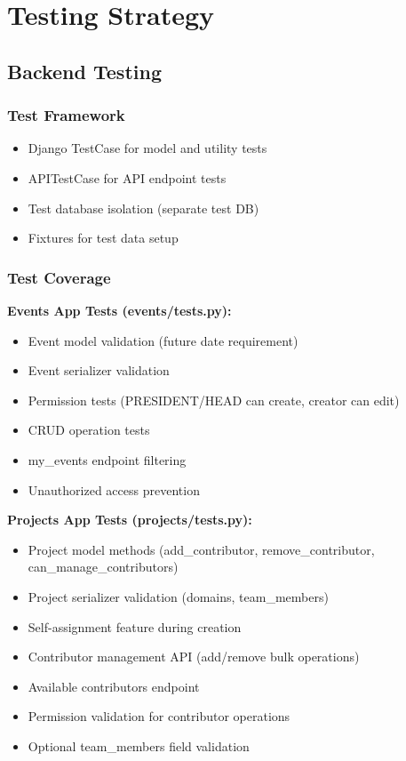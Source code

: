 \documentclass[11pt,a4paper]{article}
\begin{document}
\section{Testing Strategy}

\subsection{Backend Testing}

\subsubsection{Test Framework}
\begin{itemize}[leftmargin=*]
    \item Django TestCase for model and utility tests
    \item APITestCase for API endpoint tests
    \item Test database isolation (separate test DB)
    \item Fixtures for test data setup
\end{itemize}

\subsubsection{Test Coverage}

\textbf{Events App Tests (events/tests.py):}
\begin{itemize}[leftmargin=*]
    \item Event model validation (future date requirement)
    \item Event serializer validation
    \item Permission tests (PRESIDENT/HEAD can create, creator can edit)
    \item CRUD operation tests
    \item my\_events endpoint filtering
    \item Unauthorized access prevention
\end{itemize}

\textbf{Projects App Tests (projects/tests.py):}
\begin{itemize}[leftmargin=*]
    \item Project model methods (add\_contributor, remove\_contributor, can\_manage\_contributors)
    \item Project serializer validation (domains, team\_members)
    \item Self-assignment feature during creation
    \item Contributor management API (add/remove bulk operations)
    \item Available contributors endpoint
    \item Permission validation for contributor operations
    \item Optional team\_members field validation
\end{itemize}
\end{document}
